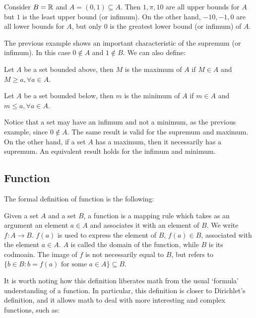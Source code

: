 \begin{eg}
    Consider $B = \mathbb{R}$ and $A = (0,1) \subseteq A$. Then $1, \pi, 10$ are all upper bounds for $A$ but $1$ is the least upper bound (or infimum). On the other hand, $-10, -1, 0$ are all lower bounds for $A$, but only $0$ is the greatest lower bound (or infimum) of $A$.
\end{eg}

The previous example shows an important characteristic of the supremum (or infimum). In this case $0 \notin A$ and $1 \notin B$. We can also define:

\begin{definition}[Maximum]
    Let $A$ be a set bounded above, then $M$ is the maximum of $A$ if $M \in A$ and $M \geq a, \forall a \in A$.
\end{definition}

\begin{definition}[Minimum]
    Let $A$ be a set bounded below, then $m$ is the minimum of $A$ if $m \in A$ and $m \leq a, \forall a \in A$.
\end{definition}

\begin{remark}
    Notice that a set may have an infimum and not a minimum, as the previous example, since $0 \notin A$. The same result is valid for the supremum and maximum. On the other hand, if a set $A$ has a maximum, then it necessarily has a supremum. An equivalent result holds for the infimum and minimum.
\end{remark}

\subsection{Function}

The formal definition of function is the following:

\begin{definition}[Function]
    Given a set $A$ and a set $B$, a function is a mapping rule which takes as an argument an element $a \in A$ and associates it with an element of $B$. We write $f: A \to B$. $f(a)$ is used to express the element of $B$, $f(a) \in B$, associated with the element $a \in A$. $A$ is called the domain of the function, while $B$ is its codmoain. The image of $f$ is not necessarily equal to $B$, but refers to $\{b \in B: b = f(a) \text{ for some } a \in A\} \subseteq B$.
\end{definition}

It is worth noting how this definition liberates math from the usual `formula' understanding of a function. In particular, this definition is closer to Dirichlet's definition, and it allows math to deal with more interesting and complex functions, such as:

